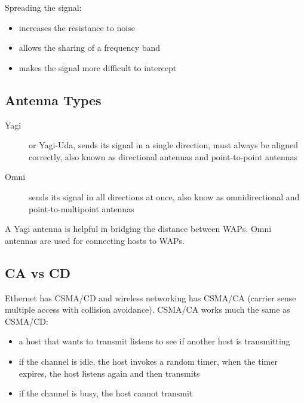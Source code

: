 Spreading the signal:

\begin{itemize}

\item increases the resistance to noise
\item allows the sharing of a frequency band
\item makes the signal more difficult to intercept

\end{itemize}

\subsection{Antenna Types}

\begin{description}

\item[Yagi]
or Yagi-Uda, sends its signal in a single direction, must always be aligned
correctly, also known as directional antennas and point-to-point antennas

\item[Omni]
sends its signal in all directions at once, also know as omnidirectional and
point-to-multipoint antennas

\end{description}

A Yagi antenna is helpful in bridging the distance between WAPs. Omni
antennas are used for connecting hosts to WAPs.

\subsection{CA vs CD}

Ethernet has CSMA/CD and wireless networking has CSMA/CA (carrier sense
multiple access with collision avoidance). CSMA/CA works much the same as
CSMA/CD:

\begin{itemize}

\item a host that wants to transmit listens to see if another host is
transmitting

\item if the channel is idle, the host invokes a random timer, when the timer
expires, the host listens again and then transmits

\item if the channel is busy, the host cannot transmit

\end{itemize}

